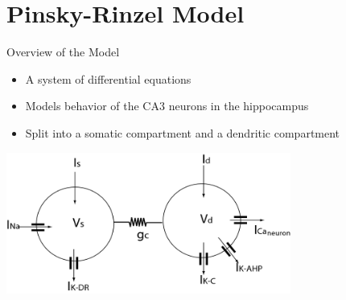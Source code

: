\section[Pinsky-Rinzel Model]{Pinsky-Rinzel Model}

\begin{frame}[fragile]{Overview of the Model}

    \begin{itemize}
        \item A system of differential equations
        \item Models behavior of the CA3 neurons in the hippocampus
        \item Split into a somatic compartment and a dendritic compartment
    \end{itemize}
    \includegraphics[width=0.7\textwidth]{Latex/Figures/prmodel_figs/Schematic_Pinsky-Rinzel_Model.png}
\end{frame}

